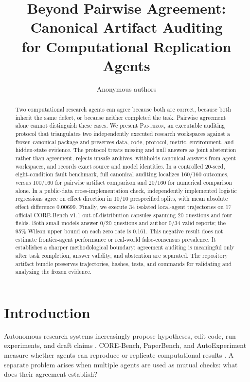 \documentclass[10pt]{article}
\title{Beyond Pairwise Agreement: Canonical Artifact Auditing\\for Computational Replication Agents}
\author{Anonymous authors}
\date{}
\newcommand{\pantheon}{\textsc{Pantheon}}
\begin{document}
\maketitle

\begin{abstract}
Two computational research agents can agree because both are correct, because both inherit the same defect, or because neither completed the task. Pairwise agreement alone cannot distinguish these cases. We present \pantheon, an executable auditing protocol that triangulates two independently executed research workspaces against a frozen canonical package and preserves data, code, protocol, metric, environment, and hidden-state evidence. The protocol treats missing and null answers as joint abstention rather than agreement, rejects unsafe archives, withholds canonical answers from agent workspaces, and records exact source and model identities. In a controlled 20-seed, eight-condition fault benchmark, full canonical auditing localizes 160/160 outcomes, versus 100/160 for pairwise artifact comparison and 20/160 for numerical comparison alone. In a public-data cross-implementation check, independently implemented logistic regressions agree on effect direction in 10/10 prespecified splits, with mean absolute effect difference 0.00699. Finally, we execute 34 isolated local-agent trajectories on 17 official CORE-Bench v1.1 out-of-distribution capsules spanning 20 questions and four fields. Both small models answer 0/20 questions and author 0/34 valid reports; the 95\% Wilson upper bound on each zero rate is 0.161. This negative result does not estimate frontier-agent performance or real-world false-consensus prevalence. It establishes a sharper methodological boundary: agreement auditing is meaningful only after task completion, answer validity, and abstention are separated. The repository artifact bundle preserves trajectories, hashes, tests, and commands for validating and analyzing the frozen evidence.
\end{abstract}

\section{Introduction}
Autonomous research systems increasingly propose hypotheses, edit code, run experiments, and draft claims \citep{lu2024aiscientist,schmidgall2025agentlaboratory}. CORE-Bench, PaperBench, and AutoExperiment measure whether agents can reproduce or replicate computational results \citep{siegel2024corebench,starace2025paperbench,kim2026autoexperiment}. A separate problem arises when multiple agents are used as mutual checks: what does their agreement establish?
\end{document}
